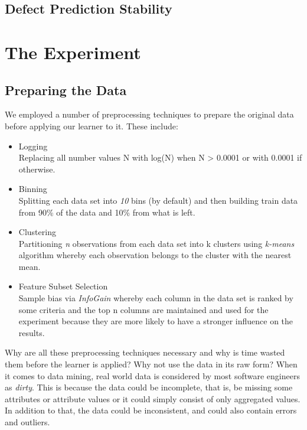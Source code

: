 \documentclass{sig-alternate}
\begin{document}
\subsection{Defect Prediction Stability}



\section{The Experiment}

\subsection{Preparing the Data}
We employed a number of preprocessing techniques to prepare the original data before applying our learner to it. These include:

\begin{itemize}
\item{Logging}
\\Replacing all number values N with log(N) when N > 0.0001 or with 0.0001 if otherwise.
\item{Binning}
\\Splitting each data set into {\em 10} bins (by default) and then building train data from 90\% of the data and 10\% from what is left.
\item{Clustering}
\\Partitioning {\em n} observations from each data set into k clusters using {\em k-means} algorithm whereby each observation belongs to the cluster with the nearest mean.
\item{Feature Subset Selection}
\\Sample bias via {\em InfoGain} whereby each column in the data set is ranked by some criteria and the top n columns are maintained and used for the experiment because they are more likely to have a stronger influence on the results.
\end{itemize}
Why are all these preprocessing techniques necessary and why is time wasted them before the learner is applied? Why not use the data in its raw form? When it comes to data mining, real world data is considered by most software engineers as {\em dirty}. This is because the data could be incomplete, that is, be missing some attributes or attribute values or it could simply consist of only aggregated values. In addition to that, the data could be inconsistent, and could also contain errors and outliers.
\end{document}
